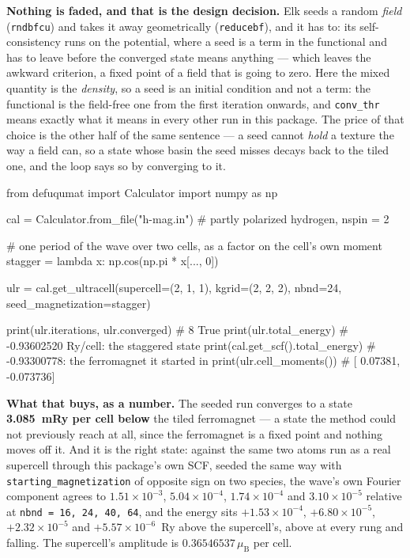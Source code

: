 \documentclass[11pt,a4paper]{article}
\newcommand{\code}[1]{\texttt{\small #1}}
\begin{document}
\textbf{Nothing is faded, and that is the design decision.} Elk seeds a random
\emph{field} (\code{rndbfcu}) and takes it away geometrically
(\code{reducebf}), and it has to: its self-consistency runs on the potential,
where a seed is a term in the functional and has to leave before the converged
state means anything --- which leaves the awkward criterion, a fixed point of a
field that is going to zero. Here the mixed quantity is the \emph{density}, so a
seed is an initial condition and not a term: the functional is the field-free one
from the first iteration onwards, and \code{conv\_thr} means exactly what it
means in every other run in this package. The price of that choice is the other
half of the same sentence --- a seed cannot \emph{hold} a texture the way a field
can, so a state whose basin the seed misses decays back to the tiled one, and the
loop says so by converging to it.

\begin{pycode}
from defuqumat import Calculator
import numpy as np

cal = Calculator.from_file("h-mag.in")   # partly polarized hydrogen, nspin = 2

# one period of the wave over two cells, as a factor on the cell's own moment
stagger = lambda x: np.cos(np.pi * x[..., 0])

ulr = cal.get_ultracell(supercell=(2, 1, 1), kgrid=(2, 2, 2), nbnd=24,
                        seed_magnetization=stagger)

print(ulr.iterations, ulr.converged)   # 8 True
print(ulr.total_energy)                # -0.93602520 Ry/cell: the staggered state
print(cal.get_scf().total_energy)      # -0.93300778: the ferromagnet it started in
print(ulr.cell_moments())              # [ 0.07381, -0.073736]
\end{pycode}

\textbf{What that buys, as a number.} The seeded run converges to a state
\textbf{3.085~mRy per cell below} the tiled ferromagnet --- a state the method
could not previously reach at all, since the ferromagnet is a fixed point and
nothing moves off it. And it is the right state: against the same two atoms run
as a real supercell through this package's own SCF, seeded the same way with
\code{starting\_magnetization} of opposite sign on two species, the wave's own
Fourier component agrees to $1.51\times10^{-3}$, $5.04\times10^{-4}$,
$1.74\times10^{-4}$ and $3.10\times10^{-5}$ relative at
\code{nbnd = 16, 24, 40, 64}, and the energy sits $+1.53\times10^{-4}$,
$+6.80\times10^{-5}$, $+2.32\times10^{-5}$ and $+5.57\times10^{-6}$~Ry above
the supercell's, above at every rung and falling. The supercell's amplitude is
$0.36546537\,\mu_{\mathrm B}$ per cell.
\end{document}
